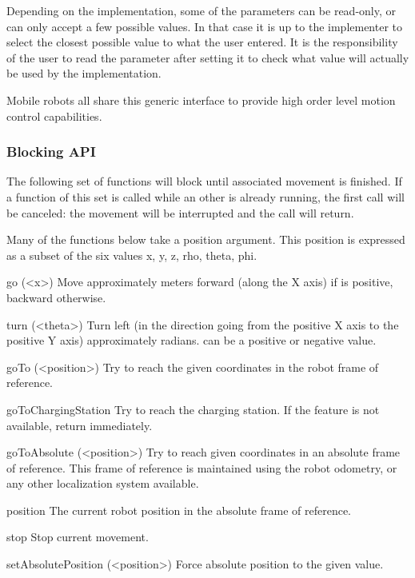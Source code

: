 Depending on the implementation, some of the parameters can be read-only, or
can only accept a few possible values. In that case it is up to the implementer
to select the closest possible value to what the user entered. It is the
responsibility of the user to read the parameter after setting it to check
what value will actually be used by the implementation.



Mobile robots all share this generic interface to provide high order
level motion control capabilities.

\subsubsection{Blocking API}

The following set of functions will block until associated movement is finished.
If a function of this set is called while an other is already running, the
first call will be canceled: the movement will be interrupted and the
call will return.

Many of the functions below take a position argument. This position is expressed
as a subset of the six values x, y, z, rho, theta, phi.

\begin{urbiscriptapi}
\item[go](<x>) Move approximately  meters forward (along the X axis)
  if  is positive, backward otherwise.

\item[turn](<theta>) Turn left (in the direction going from the positive X
  axis to the positive Y axis) approximately  radians.
   can be a positive or negative value.

\item[goTo](<position>) Try to reach the given coordinates in the robot
  frame of reference.

\item[goToChargingStation] Try to reach the charging station. If the feature
  is not available, return immediately.

\item[goToAbsolute](<position>) Try to reach given coordinates in an
  absolute frame of reference. This frame of reference is maintained using
  the robot odometry, or any other localization system available.

\item[position] The current robot position in the absolute frame of
  reference.

\item[stop] Stop current movement.

\item[setAbsolutePosition](<position>) Force absolute position to the given
  value.
\end{urbiscriptapi}

